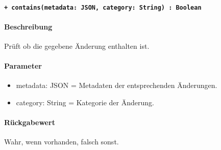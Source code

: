 \paragraph{\texttt{+ contains(metadata: JSON, category: String) : Boolean}}\label{AP_Changes_contains}%
\paragraph*{Beschreibung}
Prüft ob die gegebene Änderung enthalten ist.
\paragraph*{Parameter}
\begin{itemize}
    \item metadata: JSON = Metadaten der entsprechenden Änderungen.
    \item category: String = Kategorie der Änderung.
\end{itemize}
\paragraph*{Rückgabewert}
Wahr, wenn vorhanden, falsch sonst.